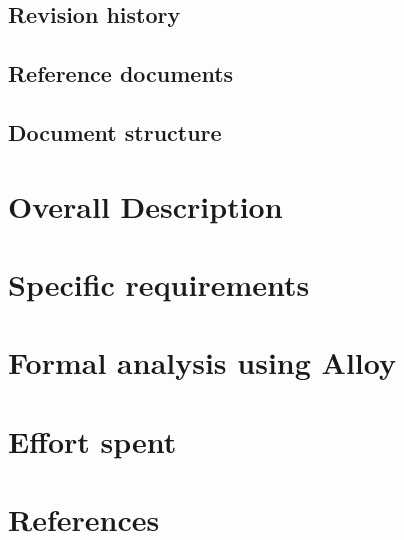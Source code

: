 \documentclass[12pt, a4paper]{article}
\begin{document}
\subsection{Revision history}
\subsection{Reference documents}
\subsection{Document structure}
\newpage

\section {Overall Description}
\newpage
\section{Specific requirements}
\newpage
\section{Formal analysis using Alloy}
\newpage
\section{Effort spent}
\newpage
\section{References}
\end{document}
